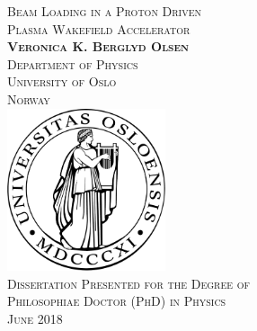 \begin{titlepage}
    \begin{center}
        \vspace*{10mm}
        \huge
        \scshape
        Beam Loading in a Proton Driven\\
        Plasma Wakefield Accelerator\\
        \vspace{20mm}
        \large
        \upshape
        \textbf{Veronica K. Berglyd Olsen}\\
        Department of Physics\\
        University of Oslo\\
        Norway\\
        \vfill
        \includegraphics[width=0.35\textwidth]{images/UiOLogo.pdf}\\
        \vspace{20mm}
        Dissertation Presented for the Degree of\\
        Philosophiae Doctor (PhD) in Physics\\
        \vspace{10mm}
        \large{June 2018}
    \end{center}
\end{titlepage}
